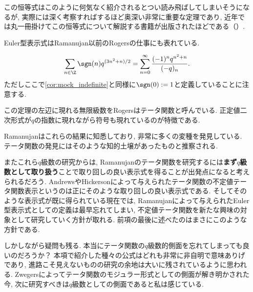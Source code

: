 \documentclass[11pt,b5paper,oneside,lualatex]{ltjsarticle} %
\numberwithin{equation}{section} %
\begin{document}
この恒等式はこのように何気なく紹介されるとつい読み飛ばしてしまいそうになるが, 実際には深く考察すればするほど奥深い非常に重要な定理であり, 近年では丸一冊掛けてこの恒等式について解説する書籍が出版されたほどである（\cite{魅惑}）. 

Euler型表示式はRamanujan以前のRogersの仕事にも表れている. 

\begin{thm}
	\begin{align}	
		\sum_{n \in \Z} \sgn(n) q^{(3n^2 + n)/2}
		=
		\sum_{n=0}^{\infty} \frac{(-1)^n q^{n^2 + n}}{(-q)_n}.
	\end{align}
	ただしここで\cref{cor:mock_indefinite}と同様に$ \sgn(0) := 1 $と定義していることに注意する. 
\end{thm}

この定理の左辺に現れる無限級数をRogersはテータ関数と呼んでいる. 
正定値二次形式が$ q $の指数に現れながら符号も現れているのが特徴である. 

Ramanujanはこれらの結果に知悉しており, 非常に多くの変種を発見している. 
テータ関数の発見にはそのような知的土壌があったものと推察される. 

またこれら$ q $級数の研究からは, Ramanujanのテータ関数を研究するには\textbf{まず$ q $級数として取り扱う}ことで取り回しの良い表示式を得ることが出発点になると考えられるだろう. 
AndrewsやHickersonによって与えられたテータ関数の不定値テータ関数表示というのは正にそのような取り回しの良い表示式である. 
そしてそのような表示式が既に得られている現在では, Ramanujanによって与えられたEuler型表示式としての定義は最早忘れてしまい, 不定値テータ関数を新たな興味の対象として研究していく方針が取れる. 
前項の最後に述べたのはまさにこのような方針である. 

しかしながら疑問も残る. 
本当にテータ関数の$ q $級数的側面を忘れてしまっても良いのだろうか？
本項で紹介した種々の公式はどれも非常に非自明で意味ありげであり, 進路こそ見えないものの研究の余地は大いに残されているように思われる. 
Zwegersによってテータ関数のモジュラー形式としての側面が解き明かされた今, 次に研究すべきは$ q $級数としての側面であると私は感じている. 
\end{document}
